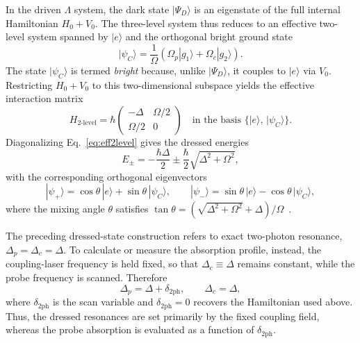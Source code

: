 In the driven $\Lambda$ system, the dark state $|\Psi_D\rangle$ is an eigenstate of the full internal Hamiltonian $H_0 + V_0$. The three-level system thus reduces to an effective two-level system spanned by $|e\rangle$ and the orthogonal bright ground state
\begin{equation}
    |\psi_C\rangle = \frac{1}{\Omega}\left(\Omega_p|g_1\rangle + \Omega_c|g_2\rangle\right).
\end{equation}
The state $|\psi_C\rangle$ is termed \emph{bright} because, unlike $|\Psi_D\rangle$, it couples to $|e\rangle$ via $V_0$. Restricting $H_0 + V_0$ to this two-dimensional subspace yields the effective interaction matrix
\begin{equation}
    H_{\text{2-level}} = \hbar\begin{pmatrix} -\Delta & \Omega/2 \\ \Omega/2 & 0 \end{pmatrix} \quad \text{in the basis } \{|e\rangle,\, |\psi_C\rangle\}.
    \label{eq:eff2level}
\end{equation}
Diagonalizing Eq.~\eqref{eq:eff2level} gives the dressed energies
\begin{equation}
    E_\pm = -\frac{\hbar\Delta}{2} \pm \frac{\hbar}{2}\sqrt{\Delta^2+\Omega^2},
    \label{eq:dressed_energies}
\end{equation}
with the corresponding orthogonal eigenvectors
\begin{equation}
    |\psi_+\rangle = \cos\theta\, |e\rangle + \sin\theta\, |\psi_C\rangle, \qquad |\psi_-\rangle = \sin\theta\, |e\rangle - \cos\theta\, |\psi_C\rangle,
    \label{eq:dressed_states}
\end{equation}
where the mixing angle $\theta$ satisfies $\tan\theta = (\sqrt{\Delta^2 + \Omega^2} + \Delta)/\Omega$~\cite{Morigi:03}.

The preceding dressed-state construction refers to exact two-photon resonance, $\Delta_p=\Delta_c=\Delta$. To calculate or measure the absorption profile, instead, the coupling-laser frequency is held fixed, so that $\Delta_c\equiv\Delta$ remains constant, while the probe frequency is scanned. Therefore
\begin{equation}
    \Delta_p=\Delta+\delta_{2\mathrm{ph}}, \qquad \Delta_c=\Delta,
    \label{eq:probe_scan_detuning}
\end{equation}
where $\delta_{2\mathrm{ph}}$ is the scan variable and $
\delta_{2\mathrm{ph}}=0$ recovers the Hamiltonian used above. Thus, the dressed resonances are set primarily by the fixed coupling field, whereas the probe absorption is evaluated as a function of $\delta_{2\mathrm{ph}}$.

